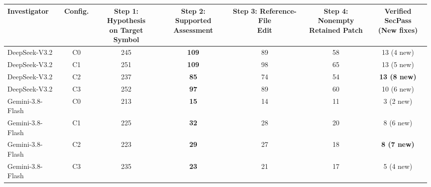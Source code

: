 \setlength{\tabcolsep}{4pt}
\renewcommand{\arraystretch}{1.12}
\begin{tabular*}{\textwidth}{@{\extracolsep{\fill}}lcccccc@{}}
\toprule
Investigator & Config. & \shortstack{Step 1: Hypothesis\\on Target Symbol} & \shortstack{\textbf{Step 2: Supported}\\\textbf{Assessment}} & \shortstack{Step 3: Reference-File\\Edit} & \shortstack{Step 4: Nonempty\\Retained Patch} & \shortstack{Verified SecPass\\(New fixes)} \\
\midrule
DeepSeek-V3.2 & C0 & 245 & \textbf{109} & 89 & 58 & 13 (4 new) \\
DeepSeek-V3.2 & C1 & 251 & \textbf{109} & 98 & 65 & 13 (5 new) \\
DeepSeek-V3.2 & C2 & 237 & \textbf{85} & 74 & 54 & \textbf{13 (8 new)} \\
DeepSeek-V3.2 & C3 & 252 & \textbf{97} & 89 & 60 & 10 (6 new) \\
\midrule
Gemini-3.8-Flash & C0 & 213 & \textbf{15} & 14 & 11 & 3 (2 new) \\
Gemini-3.8-Flash & C1 & 225 & \textbf{32} & 28 & 20 & 8 (6 new) \\
Gemini-3.8-Flash & C2 & 223 & \textbf{29} & 27 & 18 & \textbf{8 (7 new)} \\
Gemini-3.8-Flash & C3 & 235 & \textbf{23} & 21 & 17 & 5 (4 new) \\
\bottomrule
\end{tabular*}
